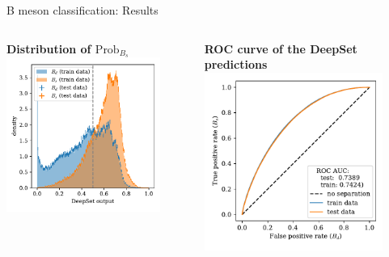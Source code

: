 \documentclass[aspectratio=1610, 10pt]{beamer}
\begin{document}
\begin{frame}{B meson classification: Results}
  \begin{columns}
    \begin{column}{0.5\textwidth}
      \centering
      \textbf{Distribution of $\text{Prob}_{B_s}$}
      \includegraphics[width=0.85\textwidth]{images/B_output.pdf}
    \end{column}
    \pause
    \begin{column}{0.5\textwidth}
      \centering
      \textbf{ROC curve of the DeepSet predictions}
      \includegraphics[width=0.85\textwidth]{images/B_ROC.pdf}
    \end{column}
  \end{columns}
\end{frame}
\end{document}
